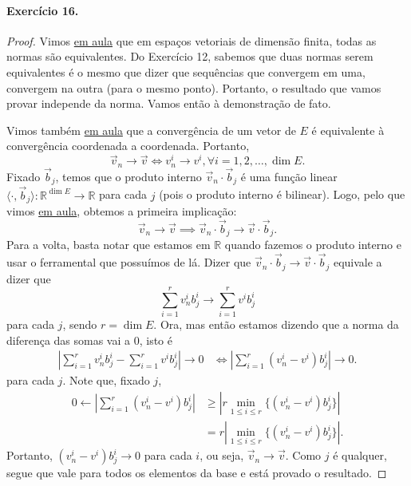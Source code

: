 \documentclass[12pt,a4paper]{article}
\begin{document}
\paragraph{Exercício 16.}
\begin{proof}
Vimos \href{https://www.youtube.com/watch?v=wszq-PtjOk4&list=PLMG2ETzS-iy95U-hwPhPRSGRHBFm8Dk2x&index=7}{em aula} que em espaços
vetoriais de dimensão finita, todas as normas são equivalentes. Do Exercício 12, sabemos que duas normas serem equivalentes é o
mesmo que dizer que sequências que convergem em uma, convergem na outra (para o mesmo ponto). 
Portanto, o resultado que vamos provar independe da norma. Vamos então à demonstração de fato.

Vimos também \href{https://www.youtube.com/watch?v=ph3VUO0AVRA&list=PLMG2ETzS-iy95U-hwPhPRSGRHBFm8Dk2x&index=5}{em aula} que
a convergência de um vetor de $E$ é equivalente à convergência coordenada a coordenada. Portanto,
\begin{equation*}
    \vec{v}_n \to \vec{v} \iff v_n^i \to v^i, \forall i = 1, 2, \dots, \dim E.
\end{equation*}
Fixado $\vec{b}_j$, temos que o produto interno $\vec{v}_n\cdot\vec{b}_j$ é uma função linear
$\langle \cdot, \vec{b}_j \rangle: \mathbb{R}^{\dim E} \to \mathbb{R}$ para cada $j$ (pois o produto interno é bilinear). Logo, 
pelo que vimos \href{https://www.youtube.com/watch?v=ph3VUO0AVRA&list=PLMG2ETzS-iy95U-hwPhPRSGRHBFm8Dk2x&index=5}{em aula},
obtemos a primeira implicação: 
\begin{equation*}
\vec{v}_n \to \vec{v} \implies \vec{v}_n\cdot \vec{b}_j \to \vec{v}\cdot\vec{b}_j.
\end{equation*}
Para a volta, basta notar que estamos em $\mathbb{R}$ quando fazemos o produto interno e usar o ferramental que possuímos de lá.
Dizer que $\vec{v}_n\cdot \vec{b}_j \to \vec{v}\cdot\vec{b}_j$ equivale a dizer que
\begin{equation*}
    \sum_{i=1}^r v_n^i b_j^i \to \sum_{i=1}^r v^i b_j^i
\end{equation*}
para cada $j$, sendo $r = \dim E$. Ora, mas então estamos dizendo que a norma da diferença das somas vai a 0, isto é
\begin{align*}
    \left|\sum_{i=1}^r v_n^i b_j^i -\sum_{i=1}^r v^i b_j^i\right| \to 0 &\iff \left| \sum_{i=1}^r (v_n^i - v^i) b_j^i \right| \to 0.
\end{align*}
para cada $j$. Note que, fixado $j$,
\begin{align*}
    0 \leftarrow \left| \sum_{i=1}^r (v_n^i - v^i) b_j^i \right| &\geq \left| r\min_{1\leq i\leq r}\{(v_n^i - v^i) b_j^i\} \right| \\
    &= r \left| \min_{1\leq i\leq r}\{(v_n^i - v^i) b_j^i\} \right|.
\end{align*}
Portanto, $(v_n^i - v^i)b_j^i \to 0$ para cada $i$, ou seja, $\vec{v}_n \to \vec{v}$. Como $j$ é qualquer, segue que vale 
para todos os elementos da base e está provado o resultado.
\end{proof}
\end{document}
